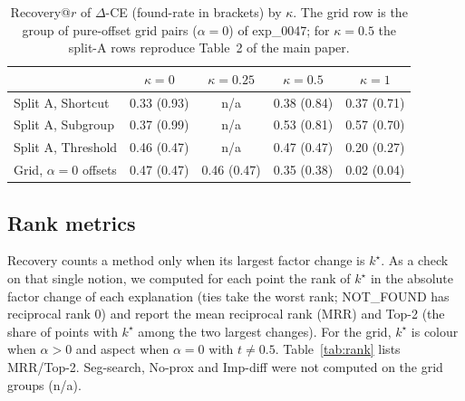 \documentclass[10pt,a4paper]{article}
\theoremstyle{remark}
\newcommand{\DCE}{$\Delta$-CE}
\begin{document}
\begin{table}[h]
\caption{Recovery@$r$ of \DCE{} (found-rate in brackets) by $\kappa$. The grid row is the group of pure-offset grid pairs ($\alpha=0$) of exp\_0047; for $\kappa=0.5$ the split-A rows reproduce Table~2 of the main paper.}\label{tab:kappa-rec}
\centering\small
\begin{tabular}{lcccc}
\toprule
 & $\kappa=0$ & $\kappa=0.25$ & $\kappa=0.5$ & $\kappa=1$\\
\midrule
Split A, Shortcut & 0.33 (0.93) & n/a & 0.38 (0.84) & 0.37 (0.71) \\
Split A, Subgroup & 0.37 (0.99) & n/a & 0.53 (0.81) & 0.57 (0.70) \\
Split A, Threshold & 0.46 (0.47) & n/a & 0.47 (0.47) & 0.20 (0.27) \\
Grid, $\alpha=0$ offsets & 0.47 (0.47) & 0.46 (0.47) & 0.35 (0.38) & 0.02 (0.04) \\
\bottomrule
\end{tabular}
\end{table}

\subsection{Rank metrics}

Recovery counts a method only when its largest factor change is $k^\star$. As a check on that single notion, we computed for each point the rank of $k^\star$ in the absolute factor change of each explanation (ties take the worst rank; NOT\_FOUND has reciprocal rank 0) and report the mean reciprocal rank (MRR) and Top-2 (the share of points with $k^\star$ among the two largest changes). For the grid, $k^\star$ is colour when $\alpha>0$ and aspect when $\alpha=0$ with $t\ne0.5$. Table~\ref{tab:rank} lists MRR/Top-2. Seg-search, No-prox and Imp-diff were not computed on the grid groups (n/a).
\end{document}
